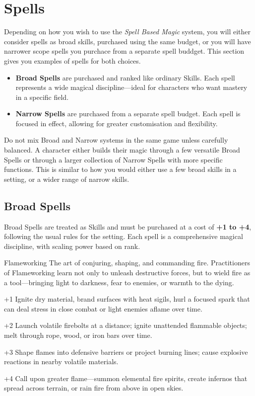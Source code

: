\section{Spells}

Depending on how you wish to use the \emph{Spell Based Magic} system, you will either consider spells as broad skills, purchased using the same budget, or you will have narrower scope spells you purchace from a separate spell buddget. This section gives you examples of spells for both choices.


\begin{itemize}
    \item \textbf{Broad Spells} are purchased and ranked like ordinary Skills. Each spell represents a wide magical discipline—ideal for characters who want mastery in a specific field.
    \item \textbf{Narrow Spells} are purchased from a separate spell budget. Each spell is focused in effect, allowing for greater customisation and flexibility.
\end{itemize}

Do not mix Broad and Narrow systems in the same game unless carefully balanced. A character either builds their magic through a few versatile Broad Spells or through a larger collection of Narrow Spells with more specific functions. This is similar to how you would either use a few broad skills in a setting, or a wider range of narrow skills.

\subsection{Broad Spells}

Broad Spells are treated as Skills and must be purchased at a cost of \textbf{+1 to +4}, following the usual rules for the setting. Each spell is a comprehensive magical discipline, with scaling power based on rank.

\begin{WyrdSpell}[Elemental]{Flameworking}
    The art of conjuring, shaping, and commanding fire. Practitioners of Flameworking learn not only to unleash destructive forces, but to wield fire as a tool—bringing light to darkness, fear to enemies, or warmth to the dying.

    \begin{WyrdSpellBlock}
        \item[+1] Ignite dry material, brand surfaces with heat sigils, hurl a focused spark that can deal stress in close combat or light enemies aflame over time.
        \item[+2] Launch volatile firebolts at a distance; ignite unattended flammable objects; melt through rope, wood, or iron bars over time.
        \item[+3] Shape flames into defensive barriers or project burning lines; cause explosive reactions in nearby volatile materials.
        \item[+4] Call upon greater flame—summon elemental fire spirits, create infernos that spread across terrain, or rain fire from above in open skies.
    \end{WyrdSpellBlock}
\end{WyrdSpell}


